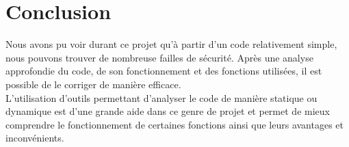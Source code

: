 \section{Conclusion}

Nous avons pu voir durant ce projet qu'à partir d'un code relativement simple, nous pouvons trouver de nombreuse failles de sécurité. Après une analyse approfondie du code, de son fonctionnement et des fonctions utilisées, il est possible de le corriger de manière efficace.\\
L'utilisation d'outils permettant d'analyser le code de manière statique ou dynamique est d'une grande aide dans ce genre de projet et permet de mieux comprendre le fonctionnement de certaines fonctions ainsi que leurs avantages et inconvénients.